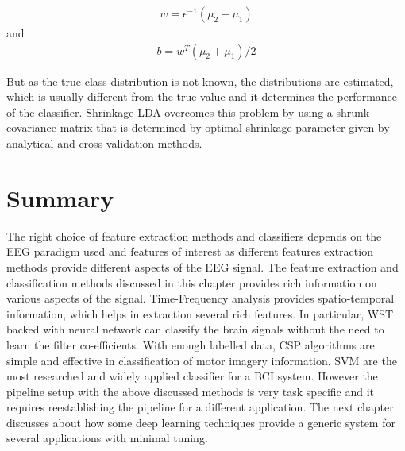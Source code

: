 \begin{equation} \label{eq:lda_w}
    \begin{split}
        w = \epsilon^{-1} (\mu_2 - \mu_1)
    \end{split}
\end{equation}
and
\begin{equation} \label{eq:lda_b}
    \begin{split}
        b = w^T(\mu_2 + \mu_1)/2
    \end{split}
\end{equation}

 But as the true class distribution is not known, the distributions are estimated, which is usually different from the true value  and it determines the performance of the classifier. Shrinkage-LDA overcomes this problem by using a shrunk covariance matrix that is determined by optimal shrinkage parameter given by analytical and cross-validation methods.

\section{Summary}
The right choice of feature extraction methods and classifiers depends on the EEG paradigm used and features of interest as different features extraction methods provide different aspects of the EEG signal. The feature extraction and classification methods discussed in this chapter provides rich information on various aspects of the signal. Time-Frequency analysis provides spatio-temporal information, which helps in extraction several rich features. In particular, WST backed with neural network can classify the brain signals without the need to learn the filter co-efficients.  With enough labelled data, CSP algorithms are simple and effective in classification of motor imagery information. SVM are the most researched and widely applied classifier for a BCI system. However the pipeline setup with the above discussed methods is very task specific and it requires reestablishing the pipeline for a different application. The next chapter discusses about how some deep learning techniques provide a generic system for several applications with minimal tuning.